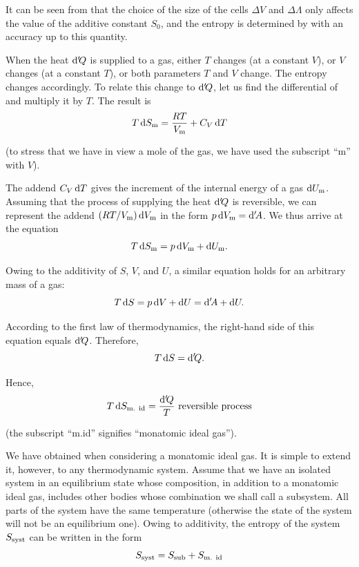 It can be seen from  that the choice of the size of the cells $\Delta V$ and $\Delta\Lambda$ only affects the value of the additive constant $S_0$, and the entropy is determined by  with an accuracy up to this quantity.

When the heat $\mathrm{d}'\!Q$ is supplied to a gas, either $T$ changes (at a constant $V$), or $V$ changes (at a constant $T$), or both parameters $T$ and $V$ change. The entropy changes accordingly. To relate this change to $\mathrm{d}'\!Q$, let us find the differential of  and multiply it by $T$. The result is
\begin{equation*}
	T\,\mathrm{d}S_{\text{m}} = \frac{RT}{V_{\text{m}}} + C_V\,\mathrm{d} T
\end{equation*}

\noindent
(to stress that we have in view a mole of the gas, we have used the subscript ``m'' with $V$).

The addend $C_V\,\mathrm{d} T$ gives the increment of the internal energy of a gas $\mathrm{d}U_{\text{m}}$. Assuming that the process of supplying the heat $\mathrm{d}'\!Q$ is reversible, we can represent the addend $(RT/V_{\text{m}})\,\mathrm{d}V_{\text{m}}$ in the form $p\,\mathrm{d}V_{\text{m}}=\mathrm{d}'\!A$. We thus arrive at the equation
\begin{equation*}
	T\,\mathrm{d}S_{\text{m}} = p\,\mathrm{d}V_{\text{m}} + \mathrm{d}U_{\text{m}}.
\end{equation*}

\noindent
Owing to the additivity of $S$, $V$, and $U$, a similar equation holds for an arbitrary mass of a gas:
\begin{equation*}
	T\,\mathrm{d} S = p\,\mathrm{d} V + \mathrm{d} U = \mathrm{d}'\!A + \mathrm{d} U.
\end{equation*}

\noindent
According to the first law of thermodynamics, the right-hand side of this equation equals $\mathrm{d}'\!Q$. Therefore,
\begin{equation*}
	T\,\mathrm{d} S = \mathrm{d}'\!Q.
\end{equation*}

\noindent
Hence,
\begin{equation}\label{eq:11_109}
	T\,\mathrm{d}S_{\text{m. id}} = \frac{\mathrm{d}'\!Q}{T}\,\,\text{reversible process}
\end{equation}

\noindent
(the subscript ``m.id'' signifies ``monatomic ideal gas'').

We have obtained  when considering a monatomic ideal gas. It is simple to extend it, however, to any thermodynamic system. Assume that we have an isolated system in an equilibrium state whose composition, in addition to a monatomic ideal gas, includes other bodies whose combination we shall call a subsystem. All parts of the system have the same temperature (otherwise the state of the system will not be an equilibrium one). Owing to additivity, the entropy of the system $S_{\text{syst}}$ can be written in the form
\begin{equation*}
	S_{\text{syst}} = S_{\text{sub}} + S_{\text{m. id}}
\end{equation*}

